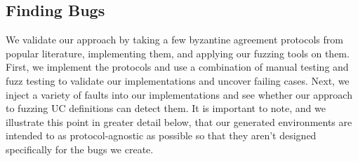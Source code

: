 \subsection{Finding Bugs}
We validate our approach by taking a few byzantine agreement protocols from popular literature, implementing them, and applying our fuzzing tools on them. 
First, we implement the protocols and use a combination of manual testing and fuzz testing to validate our implementations and uncover failing cases. 
Next, we inject a variety of faults into our implementations and see whether our approach to fuzzing UC definitions can detect them.
It is important to note, and we illustrate this point in greater detail below, that our generated environments are intended to as protocol-agnostic as possible so that they aren't designed specifically for the bugs we create.

